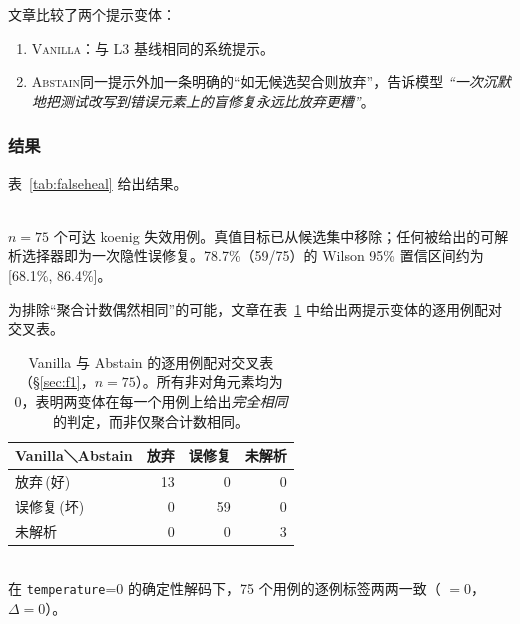 文章比较了两个提示变体：
\begin{enumerate}
\item \textsc{Vanilla}：与 L3 基线相同的系统提示。
\item \textsc{Abstain}同一提示外加一条明确的“如无候选契合则放弃”，告诉模型 \emph{“一次沉默地把测试改写到错误元素上的盲修复永远比放弃更糟”}。
\end{enumerate}

\subsubsection{结果}
表~\ref{tab:falseheal} 给出结果。

\begin{table}[t]
\centering
\caption{误修复探针（\S\ref{sec:f1}）。两个提示变体产出\emph{完全一致}的数字软提示并不降低隐性误修复。}
\label{tab:falseheal}
\small
{}
\\[2pt]
{\scriptsize $n=75$ 个可达 koenig 失效用例。真值目标已从候选集中移除；任何被给出的可解析选择器即为一次隐性误修复。78.7\%（59/75）的 Wilson 95\% 置信区间约为 [68.1\%, 86.4\%]。}
\end{table}

为排除“聚合计数偶然相同”的可能，文章在表~\ref{tab:falseheal-paired} 中给出两提示变体的逐用例配对交叉表。

\begin{table}[t]
\centering
\caption{Vanilla 与 Abstain 的逐用例配对交叉表（\S\ref{sec:f1}，$n=75$）。所有非对角元素均为 0，表明两变体在每一个用例上给出\emph{完全相同}的判定，而非仅聚合计数相同。}
\label{tab:falseheal-paired}
\small
\begin{tabular}{lrrr}
\toprule
Vanilla＼Abstain & 放弃 & 误修复 & 未解析 \\
\midrule
放弃\,(好)   & 13 & 0 & 0 \\
误修复\,(坏) & 0  & 59 & 0 \\
未解析       & 0  & 0 & 3 \\
\bottomrule
\end{tabular}
\\[2pt]
{\scriptsize 在 \texttt{temperature}=0 的确定性解码下，75 个用例的逐例标签两两一致（ $=0$，$\Delta=0$）。}
\end{table}

